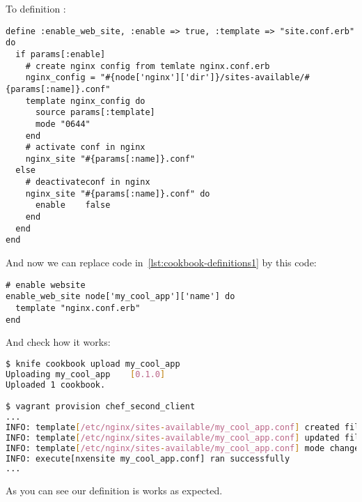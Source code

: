 To definition :

\begin{lstlisting}[label=lst:cookbook-definitions-enable-site,title=my-server-cloud/site-cookbooks/my\_cool\_app/definitions/enable\_web\_site.rb]
define :enable_web_site, :enable => true, :template => "site.conf.erb" do
  if params[:enable]
    # create nginx config from temlate nginx.conf.erb
    nginx_config = "#{node['nginx']['dir']}/sites-available/#{params[:name]}.conf"
    template nginx_config do
      source params[:template]
      mode "0644"
    end
    # activate conf in nginx
    nginx_site "#{params[:name]}.conf"
  else
    # deactivateconf in nginx
    nginx_site "#{params[:name]}.conf" do
      enable    false
    end
  end
end
\end{lstlisting}

And now we can replace code in~\ref{lst:cookbook-definitions1} by this code:

\begin{lstlisting}[label=lst:cookbook-definitions-default2,title=my-server-cloud/site-cookbooks/my\_cool\_app/recipes/default.rb]
# enable website
enable_web_site node['my_cool_app']['name'] do
  template "nginx.conf.erb"
end
\end{lstlisting}

And check how it works:

\begin{lstlisting}[language=Bash,label=lst:cookbook-definitions-shell1]
$ knife cookbook upload my_cool_app
Uploading my_cool_app    [0.1.0]
Uploaded 1 cookbook.

$ vagrant provision chef_second_client
...
INFO: template[/etc/nginx/sites-available/my_cool_app.conf] created file /etc/nginx/sites-available/my_cool_app.conf
INFO: template[/etc/nginx/sites-available/my_cool_app.conf] updated file contents /etc/nginx/sites-available/my_cool_app.conf
INFO: template[/etc/nginx/sites-available/my_cool_app.conf] mode changed to 644
INFO: execute[nxensite my_cool_app.conf] ran successfully
...
\end{lstlisting}

As you can see our definition is works as expected.